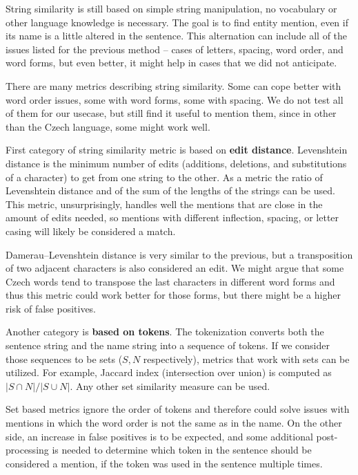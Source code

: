  String similarity is still based on simple string manipulation, no vocabulary or other language knowledge is necessary. The goal is to find entity mention, even if its name is a little altered in the sentence. This alternation can include all of the issues listed for the previous method -- cases of letters, spacing, word order, and word forms, but even better, it might help in cases that we did not anticipate.

There are many metrics describing string similarity. Some can cope better with word order issues, some with word forms, some with spacing. We do not test all of them for our usecase, but still find it useful to mention them, since in other than the Czech language, some might work well.

First category of string similarity metric is based on \textbf{edit distance}. Levenshtein distance is the minimum number of edits (additions, deletions, and substitutions of a character) to get from one string to the other. As a metric the ratio of Levenshtein distance and of the sum of the lengths of the strings can be used. This metric, unsurprisingly, handles well the mentions that are close in the amount of edits needed, so mentions with different inflection, spacing, or letter casing will likely be considered a match.

Damerau–Levenshtein distance is very similar to the previous, but a transposition of two adjacent characters is also considered an edit. We might argue that some Czech words tend to transpose the last characters in different word forms and thus this metric could work better for those forms, but there might be a higher risk of false positives.


Another category is \textbf{based on tokens}. The tokenization converts both the sentence string and the name string into a sequence of tokens. If we consider those sequences to be sets ($S, N$ respectively), metrics that work with sets can be utilized. For example, Jaccard index (intersection over union) is computed as $|S \cap N| / |S \cup N|$. Any other set similarity measure can be used. 

Set based metrics ignore the order of tokens and therefore could solve issues with mentions in which the word order is not the same as in the name. On the other side, an increase in false positives is to be expected, and some additional post-processing is needed to determine which token in the sentence should be considered a mention, if the token was used in the sentence multiple times. 


